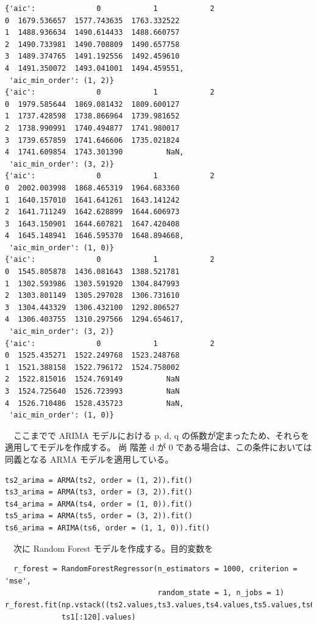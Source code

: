 \documentclass{scrartcl}
\begin{document}
\begin{verbatim}
{'aic':              0            1            2
0  1679.536657  1577.743635  1763.332522
1  1488.936634  1490.614433  1488.660757
2  1490.733981  1490.708809  1490.657758
3  1489.374765  1491.192556  1492.459610
4  1491.350072  1493.041001  1494.459551,
 'aic_min_order': (1, 2)}
{'aic':              0            1            2
0  1979.585644  1869.081432  1809.600127
1  1737.428598  1738.866964  1739.981652
2  1738.990991  1740.494877  1741.980017
3  1739.657859  1741.646606  1735.021824
4  1741.609854  1743.301390          NaN,
 'aic_min_order': (3, 2)}
{'aic':              0            1            2
0  2002.003998  1868.465319  1964.683360
1  1640.157010  1641.641261  1643.141242
2  1641.711249  1642.628899  1644.606973
3  1643.150901  1644.607821  1647.420408
4  1645.148941  1646.595370  1648.894668,
 'aic_min_order': (1, 0)}
{'aic':              0            1            2
0  1545.805878  1436.081643  1388.521781
1  1302.593986  1303.591920  1304.847993
2  1303.801149  1305.297028  1306.731610
3  1304.443329  1306.432100  1292.806527
4  1306.403755  1310.297566  1294.654617,
 'aic_min_order': (3, 2)}
{'aic':              0            1            2
0  1525.435271  1522.249768  1523.248768
1  1521.388158  1522.796172  1524.758002
2  1522.815016  1524.769149          NaN
3  1524.725640  1526.723993          NaN
4  1526.710486  1528.435723          NaN,
 'aic_min_order': (1, 0)}
\end{verbatim}

　ここまでで ARIMA モデルにおける p, d, q の係数が定まったため、それらを適用してモデルを作成する。 尚 階差 d が 0 である場合は、この条件においては同義となる ARMA モデルを適用している。\\
\begin{verbatim}
ts2_arima = ARMA(ts2, order = (1, 2)).fit()
ts3_arima = ARMA(ts3, order = (3, 2)).fit()
ts4_arima = ARMA(ts4, order = (1, 0)).fit()
ts5_arima = ARMA(ts5, order = (3, 2)).fit()
ts6_arima = ARIMA(ts6, order = (1, 1, 0)).fit()
\end{verbatim}

　次に Random Forest モデルを作成する。目的変数を\\
\begin{verbatim}
  r_forest = RandomForestRegressor(n_estimators = 1000, criterion = 'mse',
                                   random_state = 1, n_jobs = 1)
r_forest.fit(np.vstack((ts2.values,ts3.values,ts4.values,ts5.values,ts6.values)).T,
             ts1[:120].values)
\end{verbatim}
\end{document}
